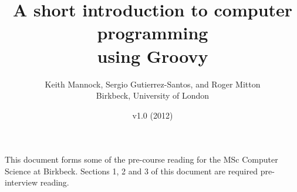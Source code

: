 \documentclass[11pt,a4paper]{article}
\title{A short introduction to computer programming\\using Groovy}
\author{Keith Mannock, Sergio Gutierrez-Santos, and Roger Mitton\\
Birkbeck, University of London}
\date{v1.0 (2012)}
\begin{document}
\maketitle



\noindent This document forms some of the pre-course reading for the
MSc Computer Science at Birkbeck.  
Sections 1, 2 and 3 of this document are required pre-interview reading.







%
\end{document}
